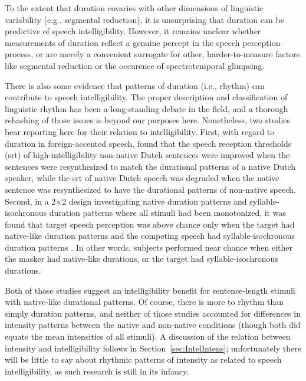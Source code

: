 To the extent that duration covaries with other dimensions of linguistic variability (e.g., segmental reduction), it is unsurprising that duration can be predictive of speech intelligibility.  However, it remains unclear whether measurements of duration reflect a genuine percept in the speech perception process, or are merely a convenient surrogate for other, harder-to-measure factors like segmental reduction or the occurence of spectrotemporal glimpsing.

There is also some evidence that patterns of duration (i.e., rhythm) can contribute to speech intelligibility.  The proper description and classification of linguistic rhythm has been a long-standing debate in the field, and a thorough rehashing of those issues is beyond our purposes here.\footnotemark{}  Nonetheless, two studies bear reporting here for their relation to intelligibility.  First, with regard to duration in foreign-accented speech, \citet{QueneVanDelft2010} found that the speech reception thresholds (\ac{srt}) of high-intelligibility non-native Dutch sentences were improved when the sentences were resynthesized to match the durational patterns of a native Dutch speaker, while the \ac{srt} of native Dutch speech was degraded when the native sentence was resynthesized to have the durational patterns of non-native speech.  Second, in a 2×2 design investigating native duration patterns and syllable-isochronous duration patterns where all stimuli had been monotonized, it was found that target speech perception was above chance only when the target had native-like duration patterns and the competing speech had syllable-isochronous duration patterns \citep{CushingDellwo2010}.  In other words, subjects performed near chance when either the masker had native-like durations, or the target had syllable-isochronous durations.  

Both of those studies suggest an intelligibility benefit for sentence-length stimuli with native-like durational patterns.  Of course, there is more to rhythm than simply duration patterns, and neither of those studies accounted for differences in intensity patterns between the native and non-native conditions (though both did equate the mean intensities of all stimuli).  A discussion of the relation between intensity and intelligibility follows in Section~\ref{sec:IntelIntens}; unfortunately there will be little to say about rhythmic patterns of intensity as related to speech intelligibility, as such research is still in its infancy.  

